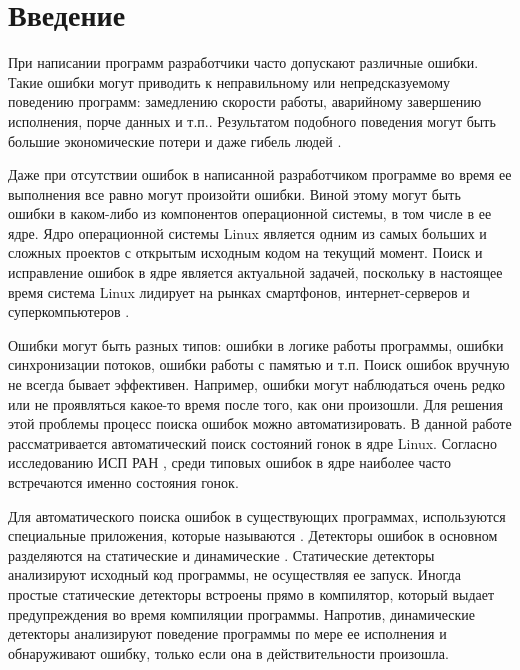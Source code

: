
\section{Введение}

При написании программ разработчики часто допускают различные ошибки.
Такие ошибки могут приводить к неправильному или непредсказуемому поведению программ: замедлению скорости работы, аварийному завершению исполнения, порче данных и т.п..
Результатом подобного поведения могут быть большие экономические потери и даже гибель людей \cite{therac25}.

Даже при отсутствии ошибок в написанной разработчиком программе во время ее выполнения все равно могут произойти ошибки.
Виной этому могут быть ошибки в каком-либо из компонентов операционной системы, в том числе в ее ядре.
Ядро операционной системы Linux является одним из самых больших и сложных проектов с открытым исходным кодом на текущий момент.
Поиск и исправление ошибок в ядре является актуальной задачей, поскольку в настоящее время система Linux лидирует на рынках смартфонов, интернет-серверов и суперкомпьютеров \cite{wiki-linux}.

Ошибки могут быть разных типов: ошибки в логике работы программы, ошибки синхронизации потоков, ошибки работы с памятью и т.п.
Поиск ошибок вручную не всегда бывает эффективен.
Например, ошибки могут наблюдаться очень редко или не проявляться какое-то время после того, как они произошли.
Для решения этой проблемы процесс поиска ошибок можно автоматизировать.
В данной работе рассматривается автоматический поиск состояний гонок в ядре Linux.
Согласно исследованию ИСП РАН \cite{kernel-bugs}, среди типовых ошибок в ядре наиболее часто встречаются именно состояния гонок.

Для автоматического поиска ошибок в существующих программах, используются специальные приложения, которые называются .
Детекторы ошибок в основном разделяются на статические и динамические \cite{static-dynamic}.
Статические детекторы анализируют исходный код программы, не осуществляя ее запуск.
Иногда простые статические детекторы встроены прямо в компилятор, который выдает предупреждения во время компиляции программы.
Напротив, динамические детекторы анализируют поведение программы по мере ее исполнения и обнаруживают ошибку, только если она в действительности произошла.

